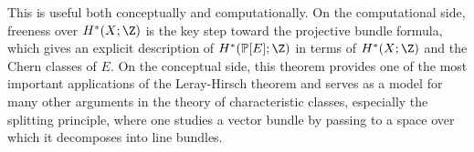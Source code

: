 \documentclass[11pt]{amsart}
\renewcommand{\P}{\mathbb{P}}
\begin{document}
This is useful both conceptually and computationally. On the computational side, freeness over $H^*(X;\Z)$ is the key step toward the projective bundle formula, which gives an explicit description of $H^*(\P[E];\Z)$ in terms of $H^*(X;\Z)$ and the Chern classes of $E$. On the conceptual side, this theorem provides one of the most important applications of the Leray-Hirsch theorem and serves as a model for many other arguments in the theory of characteristic classes, especially the splitting principle, where one studies a vector bundle by passing to a space over which it decomposes into line bundles.
\end{document}
